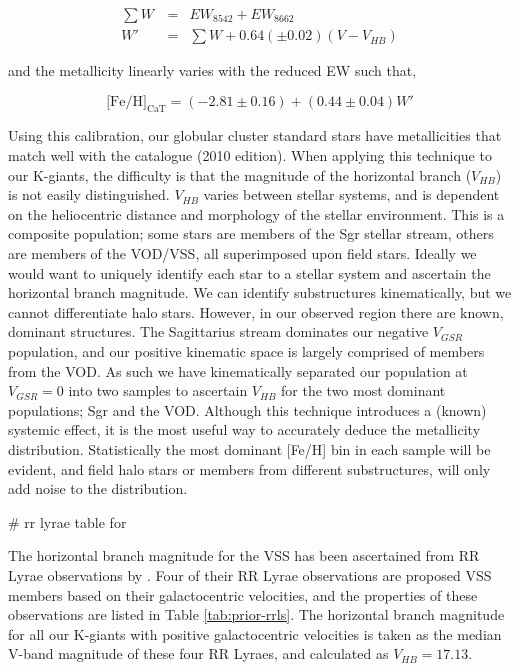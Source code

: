 \documentclass{emulateapj}
\begin{document}
\begin{eqnarray}
	\textstyle\sum{W}\, &=& EW_{8542} + EW_{8662} \\
	W' &=&\textstyle\sum{W} + 0.64\left(\pm 0.02\right)\left(V-V_{HB}\right)
\end{eqnarray}

\noindent and the metallicity linearly varies with the reduced EW such that,

\begin{equation}
	\text{[Fe/H]}_{\text{CaT}} = (-2.81 \pm 0.16) + (0.44 \pm 0.04) W'
	\label{eq:feh-cat}
\end{equation}


Using this calibration, our globular cluster standard stars have metallicities that match well with the \citet{Harris_1996} catalogue (2010 edition). When applying this technique to our K-giants, the difficulty is that the magnitude of the horizontal branch ($V_{HB}$) is not easily distinguished. $V_{HB}$ varies between stellar systems, and is dependent on the heliocentric distance and morphology of the stellar environment. This is a composite population; some stars are members of the Sgr stellar stream, others are members of the VOD/VSS, all superimposed upon field stars. Ideally we would want to uniquely identify each star to a stellar system and ascertain the horizontal branch magnitude. We can identify substructures kinematically, but we cannot differentiate halo stars. However, in our observed region there are known, dominant structures. The Sagittarius stream dominates our negative $V_{GSR}$ population, and our positive kinematic space is largely comprised of members from the VOD. As such we have kinematically separated our population at $V_{GSR} = 0$ into two samples to ascertain $V_{HB}$ for the two most dominant populations; Sgr and the VOD. Although this technique introduces a (known) systemic effect, it is the most useful way to accurately deduce the metallicity distribution. Statistically the most dominant [Fe/H] bin in each sample will be evident, and field halo stars or members from different substructures, will only add noise to the distribution.

\# rr lyrae table for 

The horizontal branch magnitude for the VSS has been ascertained from RR Lyrae observations by \citet{Prior;et-al_2009a}. Four of their RR Lyrae observations are proposed VSS members based on their galactocentric velocities, and the properties of these observations are listed in Table \ref{tab:prior-rrls}. The horizontal branch magnitude for all our K-giants with positive galactocentric velocities is taken as the median V-band magnitude of these four RR Lyraes, and calculated as $V_{HB} = 17.13$.
\end{document}
